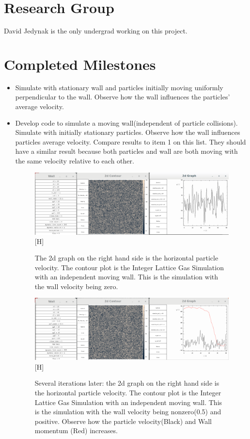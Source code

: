 \documentclass{article}
\begin{document}
\section{Research Group}
David Jedynak is the only undergrad working on this project.
\section{Completed Milestones}
\begin{itemize}
  \item Simulate with stationary wall and particles initially moving uniformly perpendicular to the wall. Observe how the wall influences the particles' average velocity.
 
    
  \item Develop code to simulate a moving wall(independent of particle collisions). Simulate with initially stationary particles. Observe how the wall influences particles average velocity. Compare results to item 1 on this list. They should have a similar result because both particles and wall are both moving with the same velocity relative to each other.
\begin{figure}

\includegraphics[scale=0.2]{ms1p0.png}[H]
\caption{\label{fig} The 2d graph on the right hand side is the horizontal particle velocity. The contour plot is the Integer Lattice Gas Simulation with an independent moving wall. This is the simulation with the wall velocity being zero.}
\end{figure} 

\begin{figure}

\includegraphics[scale=0.2]{ms1p1.png}[H]
\caption{\label{fig} Several iterations later: the 2d graph on the right hand side is the horizontal particle velocity. The contour plot is the Integer Lattice Gas Simulation with an independent moving wall. This is the simulation with the wall velocity being nonzero(0.5) and positive. Observe how the particle velocity(Black) and Wall momentum (Red) increases.}
\end{figure}


\end{itemize}
\end{document}
